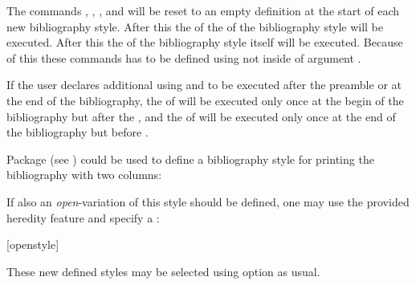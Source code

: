 The commands , , ,
and  will be reset to an empty definition at the start of
each new bibliography style. After this the  of the
 of the bibliography style will be executed. After this
the  of the bibliography style itself will be
executed. Because of this these commands has to be defined using
not  inside of argument .

If the user declares additional  using
 and
to be executed after the preamble or at the end of the bibliography, the
 of  will
be executed only once at the begin of the bibliography but after the
 , and the  of
 will be executed only once at the end
of the bibliography but before .

Package
 (see
\cite{package:multicol}) could be used to define a bibliography style for
printing the bibliography with two columns:
\begin{lstcode}
\end{lstcode}
If also an \emph{open}-variation of this style should be defined, one may use
the provided heredity feature and specify a :
\begin{lstcode}
  [openstyle]{%
    \renewcommand*{\bib@beginhook}{\begin{multicols}{2}}%
    \renewcommand*{\bib@endhook}{\end{multicols}}}%
\end{lstcode}
These new defined styles may be selected using option
 as usual.%
%
\EndIndexGroup


